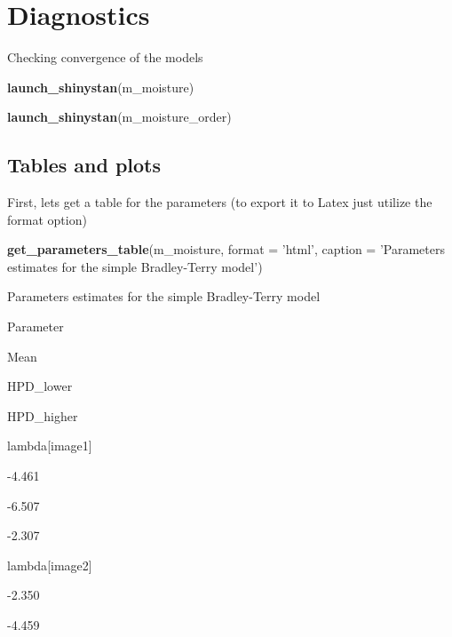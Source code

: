 \documentclass[
]{book}
\newenvironment{Shaded}{\begin{snugshade}}{\end{snugshade}}
\newcommand{\DataTypeTok}[1]{\textcolor[rgb]{0.13,0.29,0.53}{#1}}
\newcommand{\KeywordTok}[1]{\textcolor[rgb]{0.13,0.29,0.53}{\textbf{#1}}}
\newcommand{\NormalTok}[1]{#1}
\newcommand{\StringTok}[1]{\textcolor[rgb]{0.31,0.60,0.02}{#1}}
\begin{document}
\hypertarget{diagnostics-1}{%
\section{Diagnostics}\label{diagnostics-1}}

Checking convergence of the models

\begin{Shaded}
\begin{Highlighting}[]
\KeywordTok{launch_shinystan}\NormalTok{(m_moisture)}
\end{Highlighting}
\end{Shaded}

\begin{Shaded}
\begin{Highlighting}[]
\KeywordTok{launch_shinystan}\NormalTok{(m_moisture_order)}
\end{Highlighting}
\end{Shaded}

\hypertarget{tables-and-plots}{%
\subsection{Tables and plots}\label{tables-and-plots}}

First, lets get a table for the parameters (to export it to Latex just utilize the format option)

\begin{Shaded}
\begin{Highlighting}[]
\KeywordTok{get_parameters_table}\NormalTok{(m_moisture, }\DataTypeTok{format =} \StringTok{'html'}\NormalTok{, }\DataTypeTok{caption =} \StringTok{'Parameters estimates for the simple Bradley-Terry model'}\NormalTok{)}
\end{Highlighting}
\end{Shaded}

\label{tab:unnamed-chunk-27}Parameters estimates for the simple Bradley-Terry model

Parameter

Mean

HPD\_lower

HPD\_higher

lambda{[}image1{]}

-4.461

-6.507

-2.307

lambda{[}image2{]}

-2.350

-4.459
\end{document}

